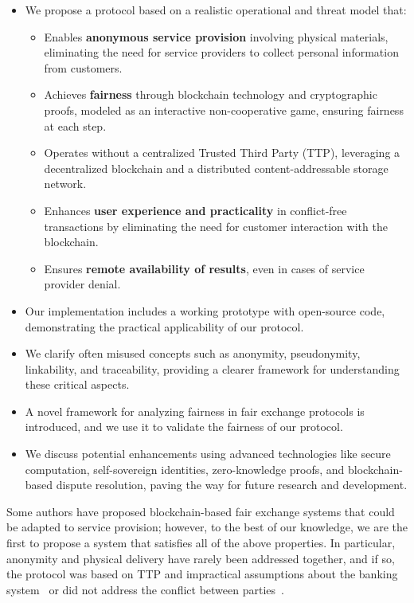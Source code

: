 \documentclass[pdftex,twocolumn,epjc3]{svjour3}
\begin{document}
\begin{sloppypar}
\begin{itemize}
    \item We propose a protocol based on a realistic operational and threat model that:
    \begin{itemize}
        \item Enables \textbf{anonymous service provision} involving physical materials, eliminating the need for service providers to collect personal information from customers.
        \item Achieves \textbf{fairness} through blockchain technology and cryptographic proofs, modeled as an interactive non-cooperative game, ensuring fairness at each step.
        \item Operates without a centralized Trusted Third Party (TTP), leveraging a decentralized blockchain and a distributed content-addressable storage network.
        \item Enhances \textbf{user experience and practicality} in conflict-free transactions by eliminating the need for customer interaction with the blockchain.
        \item Ensures \textbf{remote availability of results}, even in cases of service provider denial.
    \end{itemize}
    \item Our implementation includes a working prototype with open-source code, demonstrating the practical applicability of our protocol.
    \item We clarify often misused concepts such as anonymity, pseudonymity, linkability, and traceability, providing a clearer framework for understanding these critical aspects.
    \item A novel framework for analyzing fairness in fair exchange protocols is introduced, and we use it to validate the fairness of our protocol.
    \item We discuss potential enhancements using advanced technologies like secure computation, self-sovereign identities, zero-knowledge proofs, and blockchain-based dispute resolution, paving the way for future research and development.
\end{itemize}
\end{sloppypar}

Some authors have proposed blockchain-based fair exchange systems that could be adapted to service provision; however, to the best of our knowledge, we are the first to propose a system that satisfies all of the above properties. In particular, anonymity and physical delivery have rarely been addressed together, and if so, the protocol was based on TTP and impractical assumptions about the banking system~\cite{birjoveanuAnonymityFairexchangeEcommerce2015} or did not address the conflict between parties~\cite{altawyLelantosBlockchainBasedAnonymous2017}.
\end{document}
